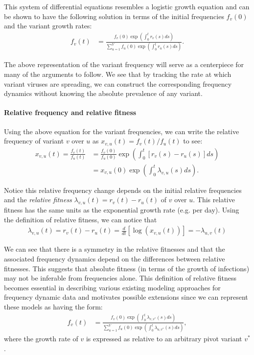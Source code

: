 \documentclass[11pt,oneside,letterpaper]{article}
\begin{document}
This system of differential equations resembles a logistic growth equation and can be shown to have the following solution in terms of the initial frequencies $f_{v}(0)$ and the variant growth rates:
\begin{align}
    f_{v}(t) &= \frac{ f_{v}(0) \exp( \int_{0}^{t} r_{v}(s) ds)}{\sum_{u=1}^{V}  f_{u}(0) \exp( \int_{0}^{t} r_{u}(s) ds)}.
\end{align}

The above representation of the variant frequency will serve as a centerpiece for many of the arguments to follow.
We see that by tracking the rate at which variant viruses are spreading, we can construct the corresponding frequency dynamics without knowing the absolute prevalence of any variant.

\paragraph{Relative frequency and relative fitness}%

Using the above equation for the variant frequencies, we can write the relative frequency of variant $v$ over $u$ as $x_{v,u}(t) = f_{v}(t) / f_{u}(t)$ to see:
\begin{align*}
    x_{v, u}(t) = \frac{f_{v}(t)}{f_{u}(t)} &= \frac{f_{v}(0)}{f_{u}(0)} \exp \left( \int_{0}^{t} [r_{v}(s) - r_{u}(s)] ds \right)\\
                                            &=x_{v,u}(0)\exp \left( \int_{0}^{t} \lambda_{v,u}(s) ds \right).
\end{align*}

Notice this relative frequency change depends on the initial relative frequencies and the \emph{relative fitness} $\lambda_{v,u}(t) = r_{v}(t) - r_{u}(t)$ of $v$ over $u$.
This relative fitness has the same units as the exponential growth rate (e.g. per day).
Using the definition of relative fitness, we can notice that
\begin{align}
\lambda_{v, u}(t) = r_{v}(t) - r_{u}(t) = \frac{d }{d t} \left[\log \left( x_{v,u}(t) \right) \right] = - \lambda_{u,v}(t)
\end{align}

We can see that there is a symmetry in the relative fitnesses and that the associated frequency dynamics depend on the differences between relative fitnesses.
This suggests that absolute fitness (in terms of the growth of infections) may not be inferable from frequencies alone.
This definition of relative fitness becomes essential in describing various existing modeling approaches for frequency dynamic data and motivates possible extensions since we can represent these models as having the form:
\begin{align}
    f_{v}(t) &= \frac{ f_{v}(0) \exp( \int_{0}^{t} \lambda_{v, v^*}(s) ds)}{\sum_{u=1}^{V}  f_{u}(0) \exp( \int_{0}^{t} \lambda_{u, v^*}(s) ds)},
\end{align}
where the growth rate of $v$ is expressed as relative to an arbitrary pivot variant $v^*$.
\end{document}
